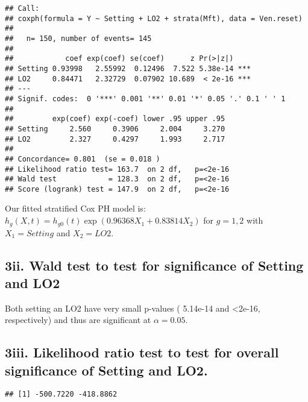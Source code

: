 \documentclass[
]{article}
\newenvironment{Shaded}{\begin{snugshade}}{\end{snugshade}}
\newcommand{\NormalTok}[1]{#1}
\newcommand{\SpecialCharTok}[1]{\textcolor[rgb]{0.00,0.00,0.00}{#1}}
\begin{document}
\begin{verbatim}
## Call:
## coxph(formula = Y ~ Setting + LO2 + strata(Mft), data = Ven.reset)
## 
##   n= 150, number of events= 145 
## 
##            coef exp(coef) se(coef)      z Pr(>|z|)    
## Setting 0.93998   2.55992  0.12496  7.522 5.38e-14 ***
## LO2     0.84471   2.32729  0.07902 10.689  < 2e-16 ***
## ---
## Signif. codes:  0 '***' 0.001 '**' 0.01 '*' 0.05 '.' 0.1 ' ' 1
## 
##         exp(coef) exp(-coef) lower .95 upper .95
## Setting     2.560     0.3906     2.004     3.270
## LO2         2.327     0.4297     1.993     2.717
## 
## Concordance= 0.801  (se = 0.018 )
## Likelihood ratio test= 163.7  on 2 df,   p=<2e-16
## Wald test            = 128.3  on 2 df,   p=<2e-16
## Score (logrank) test = 147.9  on 2 df,   p=<2e-16
\end{verbatim}

Our fitted stratified Cox PH model is:
\(h_g(X,t)=h_{g0}(t)\exp(0.96368X_1+0.83814X_2)\) for \(g=1,2\) with
\(X_1=Setting\) and \(X_2=LO2\).

\hypertarget{ii.-wald-test-to-test-for-significance-of-setting-and-lo2}{%
\subsection{3ii. Wald test to test for significance of Setting and
LO2}\label{ii.-wald-test-to-test-for-significance-of-setting-and-lo2}}

Both setting an LO2 have very small p-values ( 5.14e-14 and
\textless2e-16, respectively) and thus are significant at
\(\alpha=0.05\).

\hypertarget{iii.-likelihood-ratio-test-to-test-for-overall-significance-of-setting-and-lo2.}{%
\subsection{3iii. Likelihood ratio test to test for overall significance
of Setting and
LO2.}\label{iii.-likelihood-ratio-test-to-test-for-overall-significance-of-setting-and-lo2.}}

\begin{Shaded}
\end{Shaded}

\begin{verbatim}
## [1] -500.7220 -418.8862
\end{verbatim}
\end{document}
